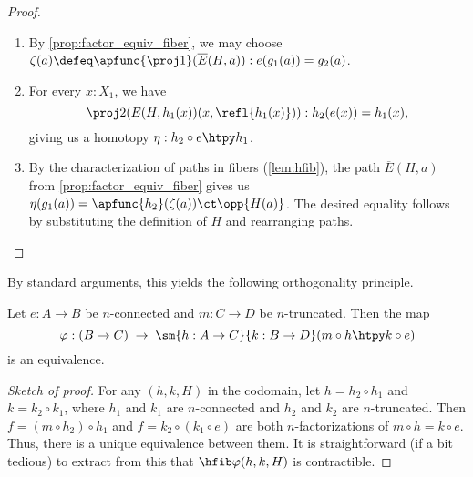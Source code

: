 \begin{proof}
\begin{enumerate}
\item By \cref{prop:factor_equiv_fiber}, we may choose
  $\zeta(a) \defeq \apfunc{\proj1}(\overline E(H,a)) : e(g_1(a)) = g_2(a)$.
  \label{item:orth-fact-2}
\item For every $x:X_1$, we have
\begin{equation*}
\proj2(E(H,h_1(x))({x,\refl{h_1(x)}})) :h_2(e(x))= h_1(x),
\end{equation*}
giving us a homotopy $\eta:h_2\circ e\htpy h_1$.
\item By the characterization of paths in fibers (\cref{lem:hfib}), the path $\overline E(H,a)$ from \cref{prop:factor_equiv_fiber} gives us
  $\eta(g_1(a)) = \apfunc{h_2}(\zeta(a)) \ct \opp{H(a)}$.
  The desired equality follows by substituting the definition of $H$ and rearranging paths.\qedhere
\end{enumerate}
\end{proof}

%

By standard arguments, this yields the following orthogonality principle.

\begin{thm}
  Let $e:A\to B$ be $n$-connected and $m:C\to D$ be $n$-truncated.
  Then the map
  \[ \varphi: (B\to C) \;\to\; \sm{h:A\to C}{k:B\to D} (m\circ h \htpy k \circ e) \]
  is an equivalence.
\end{thm}
\begin{proof}[Sketch of proof]
  For any $(h,k,H)$ in the codomain, let $h = h_2 \circ h_1$ and $k = k_2 \circ k_1$, where $h_1$ and $k_1$ are $n$-connected and $h_2$ and $k_2$ are $n$-truncated.
  Then $f = (m\circ h_2) \circ h_1$ and $f = k_2 \circ (k_1\circ e)$ are both $n$-factorizations of $m \circ h = k\circ e$.
  Thus, there is a unique equivalence between them.
  It is straightforward (if a bit tedious) to extract from this that $\hfib\varphi{(h,k,H)}$ is contractible.
\end{proof}

%
%

